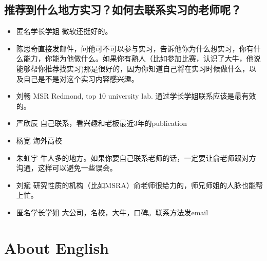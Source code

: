 \documentclass{vivid_layout}
\begin{document}
\subsection{推荐到什么地方实习？如何去联系实习的老师呢？}
\begin{itemize}
\item {\name 匿名学长学姐}  \quad 微软还挺好的。
\item { 陈思奇}\quad 直接发邮件，问他可不可以参与实习，告诉他你为什么想实习，你有什么能力，你能为他做什么。如果你有熟人（比如参加比赛，认识了大牛，他说能够帮你推荐找实习)那是很好的，因为你知道自己将在实习时候做什么，以及自己是不是对这个实习内容感兴趣。
\item  { 刘畅}  \quad MSR Redmond, top 10 university lab. 通过学长学姐联系应该是最有效的。
\item  { 严欣辰}  \quad 自己联系，看兴趣和老板最近3年的publication
\item  { 杨宽}  \quad 海外高校
\item  { 朱虹宇}  \quad 牛人多的地方。如果你要自己联系老师的话，一定要让俞老师跟对方沟通，这样可以避免一些误会。
\item  { 刘斌}  \quad 研究性质的机构（比如MSRA）俞老师很给力的，师兄师姐的人脉也能帮上忙。 
\item {\name 匿名学长学姐}  \quad 大公司，名校，大牛，口碑。联系方法发email
\end{itemize}

\section{About English}
\addtocounter{section}{1}
\setcounter{subsection}{0}
\end{document}
